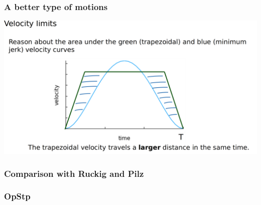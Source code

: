 \begin{frame}
	\frametitle{A better type of motions}
	\includegraphics[width=\textwidth]{./images/temporal_slide_trapezoidal_and_corners.png}
\end{frame}

\begin{frame}
	\frametitle{Comparison with Ruckig and Pilz}
\end{frame}

\begin{frame}
	\frametitle{OpStp}
\end{frame}
